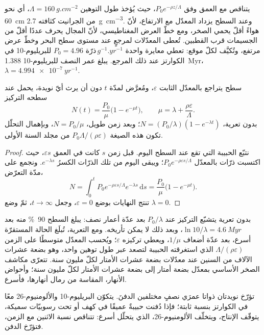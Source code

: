 يتناقص  مع العمق وفق $P_0e^{-\rho z/\Lambda}$، حيث
يُؤخذ طول التوهين $\Lambda = \qty{160}{g.cm^{-2}}$، أي نحو
\qty{60}{cm} من الجرانيت كثافته \qty{2.7}{g.cm^{-3}}. وعند السطح يزداد
المعدّل مع الارتفاع، لأنّ هواءً أقلّ يحمي الصخر، ومع
خطّ العرض المغناطيسي، لأنّ المجال يحرف عددًا أقلّ من الجسيمات قرب
القطبين. تُعطى المعدّلات لمرجعٍ عند مستوى سطح البحر وخطّ عرض مرتفع، وتُكيَّف
لكلّ موقع: تعطي معايرة واحدة $P_0 = \num{4.96}\text{ ذرّة}\,\unit{g^{-1}.yr^{-1}}$
للبريليوم-10 في الكوارتز عند ذلك المرجع. يبلغ عمر النصف للبريليوم-10
\qty{1.388}{Myr}، $\lambda = \qty{4.994e-7}{yr^{-1}}$.

\begin{theorem}\label{thm:b3:advanced-geochronology:exposure}
سطح يتراجع بالمعدّل الثابت $\varepsilon$، ومُعرَّض لمدّة $t$
دون أن يرث أيّ نويدة، يحمل عند سطحه التركيز
\[
N(t) = \frac{P_0}{\mu}\bigl(1 - e^{-\mu t}\bigr), \qquad
\mu = \lambda + \frac{\rho\varepsilon}{\Lambda}.
\]
بدون تعرية، $N = (P_0/\lambda)(1 - e^{-\lambda t})$؛ وبعد زمن طويل،
$N = P_0/\mu$، وبإهمال التحلّل تكون هذه الصيغة $P_0\Lambda/(\rho\varepsilon)$
من مجلد السنة الأولى.
\end{theorem}

\begin{proof}
نتبّع الحبيبة التي تقع عند السطح اليوم. قبل زمن $s$ كانت في
العمق $\varepsilon s$، حيث اكتسبت ذرّات بالمعدّل $P_0e^{-\rho\varepsilon
s/\Lambda}$؛ ويبقى اليوم من تلك الذرّات الكسرُ $e^{-\lambda s}$. ونجمع
على مدّة التعرّض،
\[
N = \int_0^t P_0e^{-\rho\varepsilon s/\Lambda}e^{-\lambda s}\,\mathrm ds
= \frac{P_0}{\mu}\bigl(1 - e^{-\mu t}\bigr).
\]
تنتج النهايات بوضع $\varepsilon = 0$، وجعل $t \to \infty$، ثمّ
وضع $\lambda = 0$.
\end{proof}

بدون تعرية يتشبّع التركيز عند $P_0/\lambda$ بعد عدّة
أعمار نصف: يبلغ السطح \qty{90}{\percent} منه بعد $\ln 10/\lambda
= \qty{4.6}{Myr}$، وبعد ذلك لا يمكن تأريخه. ومع التعرية،
تُبلَغ الحالة المستقرّة أسرع، بعد عدّة أضعاف $1/\mu$، ويعطي
تركيزه $\varepsilon$؛ ويُحسب المعدّل متوسطًا على الزمن
$\Lambda/(\rho\varepsilon)$ الذي استغرقته الحبيبة لتصعد عبر طول توهين
واحد، وهو بضعة عشرات الآلاف من السنين عند معدّلات بضعة
عشرات الأمتار لكلّ مليون سنة. تتعرّى مكاشف الصخر الأساسي بمعدّل بضعة أمتار
إلى بضعة عشرات الأمتار لكلّ مليون سنة؛ وأحواض الأنهار، المقاسة من
رمال أنهارها، فأسرع.

تؤرّخ نويدتان ذواتا عمرَي نصفٍ مختلفين الدفنَ. يتكوّن البريليوم-10 والألومنيوم-26
معًا في الكوارتز بنسبة ثابتة؛ فإذا دُفنت حبيبةٌ
عميقًا في كهف أو تحت رسوبيّات سميكة، يتوقّف الإنتاج،
ويتخلّف الألومنيوم-26، الذي يتحلّل أسرع: تتناقص نسبة الاثنين
مع الزمن، فتؤرّخ الدفن.

